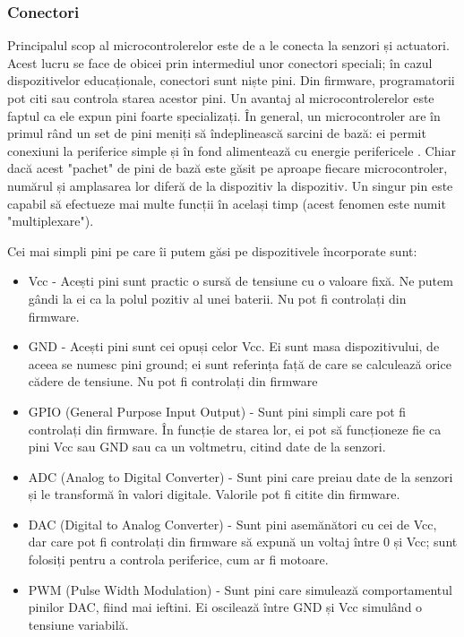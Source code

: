 \subsubsection{Conectori}
\label{sec:embed-ics-micro-con}

Principalul scop al microcontrolerelor este de a le conecta la senzori și
actuatori. Acest lucru se face de obicei prin intermediul unor conectori
speciali; în cazul dispozitivelor educaționale, conectori sunt niște pini. Din
firmware, programatorii pot citi sau controla starea acestor pini. Un avantaj al
microcontrolerelor este faptul ca ele expun pini foarte specializați. În
general, un microcontroler are în primul rând un set de pini meniți să
îndeplinească sarcini de bază: ei permit conexiuni la periferice simple și în
fond alimentează cu energie perifericele . Chiar dacă acest "pachet" de pini de
bază este găsit pe aproape fiecare microcontroler, numărul și amplasarea lor
diferă de la dispozitiv la dispozitiv. Un singur pin este capabil să efectueze
mai multe funcții în același timp (acest fenomen este numit "multiplexare").

Cei mai simpli pini pe care îi putem găsi pe dispozitivele încorporate sunt:

\begin{itemize}
	\item Vcc - Acești pini sunt practic o sursă de tensiune cu o valoare
		fixă. Ne putem gândi la ei ca la polul pozitiv al unei baterii.
		Nu pot fi controlați din firmware.
	\item GND - Acești pini sunt cei opuși celor Vcc. Ei sunt masa
		dispozitivului, de aceea se numesc pini ground; ei sunt
		referința față de care se calculează orice cădere de tensiune.
		Nu pot fi controlați din firmware
	\item GPIO (General Purpose Input Output) - Sunt pini simpli care pot fi
		controlați din firmware. În funcție de starea lor, ei pot să
		funcționeze fie ca pini Vcc sau GND sau ca un voltmetru, citind
		date de la senzori.
	\item ADC (Analog to Digital Converter) - Sunt pini care preiau date de
		la senzori și le transformă în valori digitale. Valorile pot fi
		citite din firmware.
	\item DAC (Digital to Analog Converter) - Sunt pini asemănători cu cei
		de Vcc, dar care pot fi controlați din firmware să expună un
		voltaj între 0 și Vcc; sunt folosiți pentru a controla
		periferice, cum ar fi motoare.
	\item PWM (Pulse Width Modulation) - Sunt pini care simulează
		comportamentul pinilor DAC, fiind mai ieftini. Ei oscilează
		între GND și Vcc simulând o tensiune variabilă.
\end{itemize}

